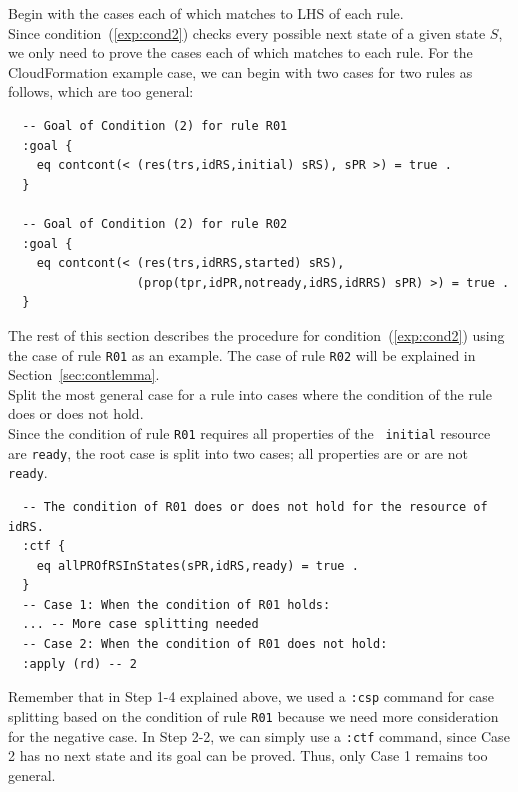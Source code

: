 \documentclass[12pt]{report}
\begin{document}
 Begin with the cases each of which matches to
LHS of each rule. \\ Since condition~(\ref{exp:cond2}) checks every
possible next state of a given state $S$, we only need to prove the
cases each of which matches to each rule. For the CloudFormation
example case, we can begin with two cases for two rules as follows,
which are too general:
\begin{verbatim}
  -- Goal of Condition (2) for rule R01
  :goal {
    eq contcont(< (res(trs,idRS,initial) sRS), sPR >) = true .
  }

  -- Goal of Condition (2) for rule R02
  :goal {
    eq contcont(< (res(trs,idRRS,started) sRS),
                  (prop(tpr,idPR,notready,idRS,idRRS) sPR) >) = true .
  }
\end{verbatim}

The rest of this section describes the procedure for condition~(\ref{exp:cond2})
using the case of rule {\tt R01} as an example. The case of rule {\tt R02} will
be explained in Section~\ref{sec:contlemma}.\\

 Split the most general case for a rule into
cases where the condition of the rule does or does not hold. \\ Since
the condition of rule {\tt R01} requires all properties of the {\tt
  initial} resource are {\tt ready}, the root case is split into two
cases; all properties are or are not {\tt ready}. 
\begin{verbatim}
  -- The condition of R01 does or does not hold for the resource of idRS.
  :ctf {
    eq allPROfRSInStates(sPR,idRS,ready) = true .
  }
  -- Case 1: When the condition of R01 holds:
  ... -- More case splitting needed
  -- Case 2: When the condition of R01 does not hold:
  :apply (rd) -- 2
\end{verbatim}
Remember that in Step 1-4 explained above, we used a {\tt :csp}
command for case splitting based on the condition of rule {\tt R01}
because we need more consideration for the negative case.  In Step
2-2, we can simply use a {\tt :ctf} command, since Case 2 has no next
state and its goal can be proved. Thus, only Case 1 remains too
general. \\
\end{document}
